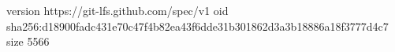 version https://git-lfs.github.com/spec/v1
oid sha256:d18900fadc431e70c47f4b82ea43f6dde31b301862d3a3b18886a18f3777d4c7
size 5566
